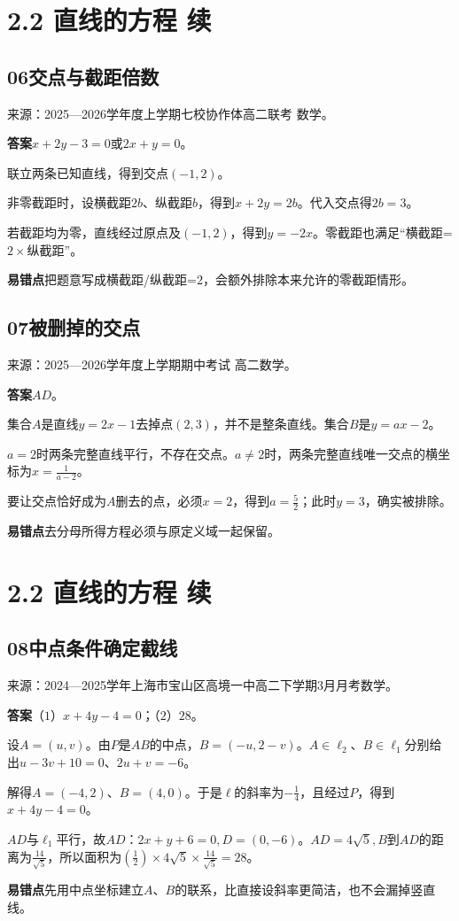 \documentclass[UTF8,11pt,a4paper,fontset=windows]{ctexart}
\newcommand{\qhead}[2]{\subsection{#1\texorpdfstring{\quad}{ }#2}}
\newcommand{\qsource}[1]{{\footnotesize 来源：#1。\par}}
\begin{document}
\section{2.2 直线的方程 续}

\qhead{06}{交点与截距倍数}
\qsource{2025—2026学年度上学期七校协作体高二联考 数学}
\textbf{答案}\quad \(x+ 2y- 3= 0\)或\(2x+ y= 0\)。\par
联立两条已知直线，得到交点\(\left(- 1,\allowbreak 2\right)\)。\par
非零截距时，设横截距\(2b\)、纵截距\(b\)，得到\(x+ 2y= 2b\)。代入交点得\(2b= 3\)。\par
若截距均为零，直线经过原点及\(\left(- 1,\allowbreak 2\right)\)，得到\(y= - 2x\)。零截距也满足“横截距=\(2\times \)纵截距”。\par
{\small\textbf{易错点}\quad 把题意写成横截距/纵截距=\(2\)，会额外排除本来允许的零截距情形。\par}

\qhead{07}{被删掉的交点}
\qsource{2025—2026学年度上学期期中考试 高二数学}
\textbf{答案}\quad \(AD\)。\par
集合\(A\)是直线\(y= 2x- 1\)去掉点\(\left(2,\allowbreak 3\right)\)，并不是整条直线。集合\(B\)是\(y= ax- 2\)。\par
\(a= 2\)时两条完整直线平行，不存在交点。\(a\ne 2\)时，两条完整直线唯一交点的横坐标为\(x= \frac{1}{a- 2}\)。\par
要让交点恰好成为\(A\)删去的点，必须\(x= 2\)，得到\(a= \frac{5}{2}\)；此时\(y= 3\)，确实被排除。\par
{\small\textbf{易错点}\quad 去分母所得方程必须与原定义域一起保留。\par}

\clearpage

\section{2.2 直线的方程 续}

\qhead{08}{中点条件确定截线}
\qsource{2024—2025学年上海市宝山区高境一中高二下学期3月月考数学}
\textbf{答案}\quad （\(1\)）\(x+ 4y- 4= 0\)；（\(2\)）\(28\)。\par
设\(A= \left(u,\allowbreak v\right)\)。由\(P\)是\(AB\)的中点，\(B= \left(- u,\allowbreak 2- v\right)\)。\(A\in \ell _{2}\)、\(B\in \ell _{1}\)分别给出\(u- 3v+ 10= 0\)、\(2u+ v= - 6\)。\par
解得\(A= \left(- 4,\allowbreak 2\right)\)、\(B= \left(4,\allowbreak 0\right)\)。于是\(\ell \)的斜率为\(- \frac{1}{4}\)，且经过\(P\)，得到\(x+ 4y- 4= 0\)。\par
\(AD\)与\(\ell _{1}\)平行，故\(AD\)：\(2x+ y+ 6= 0,\allowbreak D= \left(0,\allowbreak - 6\right)\)。\(AD= 4\sqrt{5},\allowbreak B\)到\(AD\)的距离为\(\frac{14}{\sqrt{5}}\)，所以面积为\(\left(\frac{1}{2}\right)\times 4\sqrt{5}\times \frac{14}{\sqrt{5}}= 28\)。\par
{\small\textbf{易错点}\quad 先用中点坐标建立\(A\)、\(B\)的联系，比直接设斜率更简洁，也不会漏掉竖直线。\par}
\end{document}
